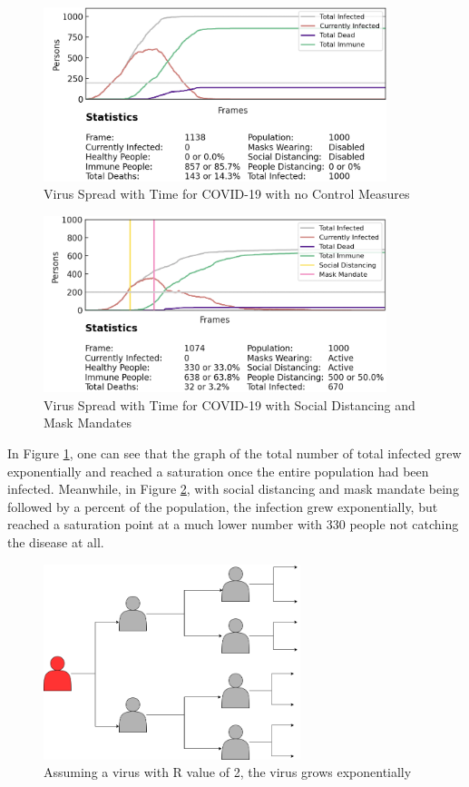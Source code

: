 \documentclass[11pt]{article}
\begin{document}
\begin{figure}[H]
    \centering
    \includegraphics[width=10cm]{figures/covid-nomandates.png}
    \caption{Virus Spread with Time for COVID-19 with no Control Measures}
    \label{covid-exponential-nomandate}
\end{figure}

\begin{figure}[H]
    \centering
    \includegraphics[width=10cm]{figures/covid-propermandates.png}
    \caption{Virus Spread with Time for COVID-19 with Social Distancing and Mask Mandates}
    \label{covid-exponential-mandates}
\end{figure}

In Figure \ref{covid-exponential-nomandate}, one can see that the graph of the total number of total infected grew exponentially and reached a saturation once the entire population had been infected. Meanwhile, in Figure \ref{covid-exponential-mandates}, with social distancing and mask mandate being followed by a percent of the population, the infection grew exponentially, but reached a saturation point at a much lower number with 330 people not catching the disease at all.

\begin{figure}[H]
    \centering
    \includegraphics[width=7.5cm]{figures/covid-exponential.png}
    \caption{Assuming a virus with R value of 2, the virus grows exponentially}
    \label{covid-exponential}
\end{figure}
\end{document}
